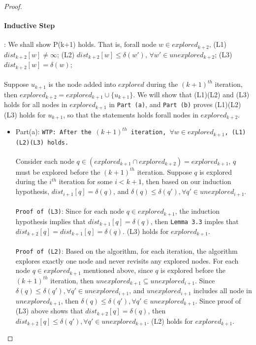 \begin{proof}
\paragraph*{Inductive Step}: We shall show P(k+1) holds. That is, forall node $w \in explored_{k+2}$, (L1) $dist_{k+2}[w] \neq \infty$; (L2) $dist_{k+2}[w]\leq \delta(w')$, $\forall w' \in unexplored_{k+2}$; (L3) $dist_{k+2}[w] = \delta(w)$;
\\\\
Suppose $u_{k+1}$ is the node added into $explored$ during the $(k+1)^{th}$ iteration, then $explored_{k+2} = explored_{k+1} \cup \{u_{k+1}\}$. We will show that (L1)(L2) and (L3) holds for all nodes in $explored_{k+1}$ in \texttt{Part (a)}, and \texttt{Part (b)} proves (L1)(L2)(L3) holds for $u_{k+1}$, so that the statements holds forall nodes in $explored_{k+2}$. 
\begin{itemize}
  \item Part(a): \texttt{WTP: After the $(k+1)^{th}$ iteration, $\forall w \in explored_{k+1}$, (L1)(L2)(L3) holds.} 
  \\\\
  Consider each node $q \in (explored_{k+1} \cap explored_{k+2}) = explored_{k+1}$, $q$ must be explored before the $(k+1)^{th}$ iteration. Suppose $q$ is explored during the $i^{th}$ iteration for some $i < k+1$, then based on our induction hypothesis, $dist_{i+1}[q] = \delta(q)$, and $\delta(q) \leq \delta(q'), \forall q' \in unexplored_{i+1}$. 
  \\\\
  \texttt{Proof of (L3)}: Since for each node $q \in explored_{k+1}$, the induction hypothesis implies that $dist_{k+1}[q] = \delta(q)$, then \texttt{Lemma 3.3} imples that $dist_{k+2}[q] = dist_{k+1}[q] = \delta(q)$. (L3) holds for $explored_{k+1}$.
  \\\\
  \texttt{Proof of (L2)}: Based on the algorithm, for each iteration, the algorithm explores exactly one node and never revisits any explored nodes. For each node $q \in explored_{k+1}$ mentioned above, since $q$ is explored before the $(k+1)^{th}$ iteration, then $unexplored_{k+1} \subseteq unexplored_{i+1}$. Since $\delta(q) \leq \delta(q'), \forall q' \in unexplored_{i+1}$, and $unexplored_{i+1}$ includes all node in $unexplored_{k+1}$, then $\delta(q) \leq \delta(q'), \forall q' \in unexplored_{k+1}$. Since proof of (L3) above shows that $dist_{k+2}[q] = \delta(q)$, then $dist_{k+2}[q] \leq \delta(q'), \forall q' \in unexplored_{k+1}$. (L2) holds for $explored_{k+1}$. 

\end{itemize}
\end{proof}
